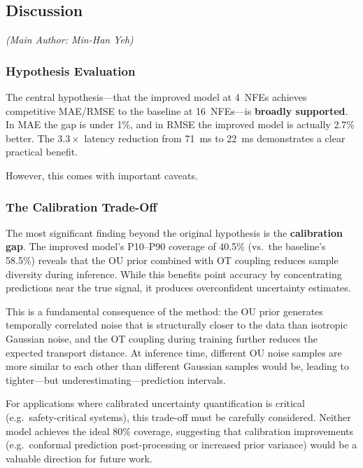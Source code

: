 \documentclass[11pt,a4paper]{article}
\begin{document}
\subsection{Discussion}
\label{sec:discussion}
\textit{(Main Author: Min-Han Yeh)}

\subsubsection{Hypothesis Evaluation}

The central hypothesis---that the improved model at 4~NFEs achieves
competitive MAE/RMSE to the baseline at 16~NFEs---is \textbf{broadly
supported}.
In MAE the gap is under 1\%, and in RMSE the improved model is actually
2.7\% better.
The $3.3\times$ latency reduction from \SI{71}{\milli\second} to
\SI{22}{\milli\second} demonstrates a clear practical benefit.

However, this comes with important caveats.

\subsubsection{The Calibration Trade-Off}

The most significant finding beyond the original hypothesis is the
\textbf{calibration gap}.
The improved model's P10--P90 coverage of 40.5\%
(vs.\ the baseline's 58.5\%) reveals that the OU prior combined with OT
coupling reduces sample diversity during inference.
While this benefits point accuracy by concentrating predictions near the
true signal, it produces overconfident uncertainty estimates.

This is a fundamental consequence of the method: the OU prior generates
temporally correlated noise that is structurally closer to the data than
isotropic Gaussian noise, and the OT coupling during training further reduces
the expected transport distance.
At inference time, different OU noise samples are more similar to each other
than different Gaussian samples would be, leading to tighter---but
underestimating---prediction intervals.

For applications where calibrated uncertainty quantification is critical
(e.g.\ safety-critical systems), this trade-off must be carefully considered.
Neither model achieves the ideal 80\% coverage, suggesting that calibration
improvements (e.g.\ conformal prediction post-processing or increased prior
variance) would be a valuable direction for future work.
\end{document}
